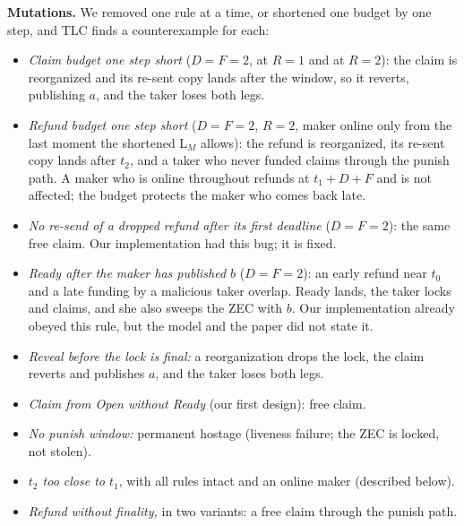 \documentclass[10pt,letterpaper]{article}
\theoremstyle{plain}
\theoremstyle{definition}
\newcommand{\st}[1]{\textsf{#1}}
\begin{document}
\textbf{Mutations.} We removed one rule at a time, or shortened one budget by one step, and TLC
finds a counterexample for each:
\begin{itemize}\setlength\itemsep{0.05em}
\item \emph{Claim budget one step short} ($D=F=2$, at $R=1$ and at $R=2$): the claim is reorganized and its re-sent copy
lands after the window, so it reverts, publishing $a$, and the taker loses both legs.
\item \emph{Refund budget one step short} ($D=F=2$, $R=2$, maker online only from the last moment
the shortened L$_M$ allows): the refund is reorganized, its re-sent copy lands after $t_2$, and a
taker who never funded claims through the punish path. A maker who is online throughout refunds
at $t_1 + D + F$ and is not affected; the budget protects the maker who comes back late.
\item \emph{No re-send of a dropped refund after its first deadline} ($D=F=2$): the same free
claim. Our implementation had this bug; it is fixed.
\item \emph{Ready after the maker has published $b$} ($D=F=2$): an early refund near $t_0$ and a
late funding by a malicious taker overlap. Ready lands, the taker locks and claims, and she also
sweeps the ZEC with $b$. Our implementation already obeyed this rule, but the model and the
paper did not state it.
\item \emph{Reveal before the lock is final:} a reorganization drops the lock, the claim reverts and
publishes $a$, and the taker loses both legs.
\item \emph{Claim from \st{Open} without Ready} (our first design): free claim.
\item \emph{No punish window:} permanent hostage (liveness failure; the ZEC is locked, not stolen).
\item \emph{$t_2$ too close to $t_1$}, with all rules intact and an online maker (described below).
\item \emph{Refund without finality,} in two variants: a free claim through the punish path.
\end{itemize}
\end{document}
